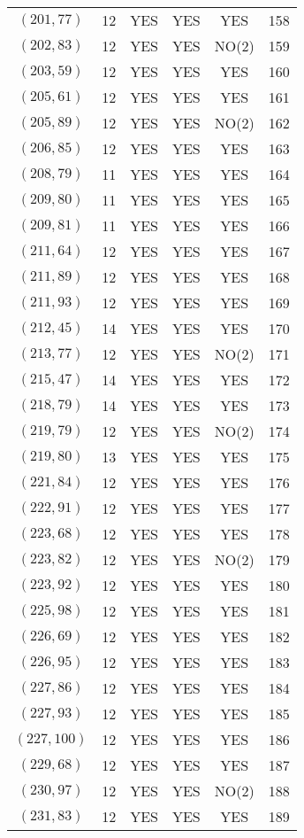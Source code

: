 \begin{longtable}{|c|c|c|c|c|c|}
$(201, 77)$ & 12 & YES & YES & YES & 158\\
$(202, 83)$ & 12 & YES & YES & NO(2) & 159\\
$(203, 59)$ & 12 & YES & YES & YES & 160\\
$(205, 61)$ & 12 & YES & YES & YES & 161\\
$(205, 89)$ & 12 & YES & YES & NO(2) & 162\\
$(206, 85)$ & 12 & YES & YES & YES & 163\\
$(208, 79)$ & 11 & YES & YES & YES & 164\\
$(209, 80)$ & 11 & YES & YES & YES & 165\\
$(209, 81)$ & 11 & YES & YES & YES & 166\\
$(211, 64)$ & 12 & YES & YES & YES & 167\\
$(211, 89)$ & 12 & YES & YES & YES & 168\\
$(211, 93)$ & 12 & YES & YES & YES & 169\\
$(212, 45)$ & 14 & YES & YES & YES & 170\\
$(213, 77)$ & 12 & YES & YES & NO(2) & 171\\
$(215, 47)$ & 14 & YES & YES & YES & 172\\
$(218, 79)$ & 14 & YES & YES & YES & 173\\
$(219, 79)$ & 12 & YES & YES & NO(2) & 174\\
$(219, 80)$ & 13 & YES & YES & YES & 175\\
$(221, 84)$ & 12 & YES & YES & YES & 176\\
$(222, 91)$ & 12 & YES & YES & YES & 177\\
$(223, 68)$ & 12 & YES & YES & YES & 178\\
$(223, 82)$ & 12 & YES & YES & NO(2) & 179\\
$(223, 92)$ & 12 & YES & YES & YES & 180\\
$(225, 98)$ & 12 & YES & YES & YES & 181\\
$(226, 69)$ & 12 & YES & YES & YES & 182\\
$(226, 95)$ & 12 & YES & YES & YES & 183\\
$(227, 86)$ & 12 & YES & YES & YES & 184\\
$(227, 93)$ & 12 & YES & YES & YES & 185\\
$(227, 100)$ & 12 & YES & YES & YES & 186\\
$(229, 68)$ & 12 & YES & YES & YES & 187\\
$(230, 97)$ & 12 & YES & YES & NO(2) & 188\\
$(231, 83)$ & 12 & YES & YES & YES & 189\\

\end{longtable}
